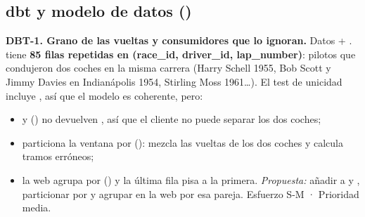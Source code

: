 \subsection{dbt y modelo de datos ()}

\textbf{DBT-1. Grano de las vueltas y consumidores que lo ignoran.} Datos + .  tiene \textbf{85 filas repetidas en (race\_id, driver\_id, lap\_number)}: pilotos que condujeron dos coches en la misma carrera (Harry Schell 1955, Bob Scott y Jimmy Davies en Indianápolis 1954, Stirling Moss 1961…). El test de unicidad incluye , así que el modelo es coherente, pero:

\begin{itemize}
\item {} y  () no devuelven , así que el cliente no puede separar los dos coches;
\item {} particiona la ventana por  (): mezcla las vueltas de los dos coches y calcula tramos erróneos;
\item la web agrupa por  () y la última fila pisa a la primera. \emph{Propuesta:} añadir  a  y , particionar  por  y agrupar en la web por esa pareja. Esfuerzo S-M · Prioridad media.
\end{itemize}

